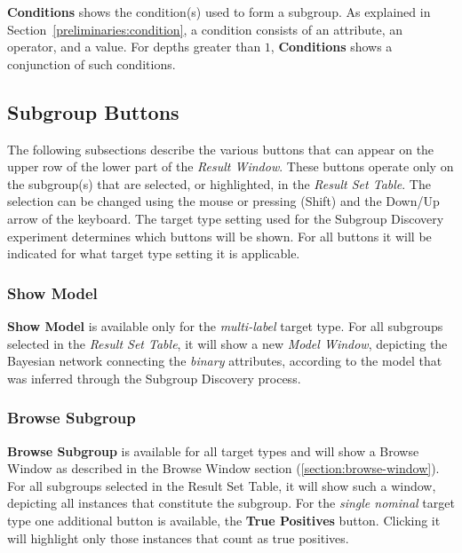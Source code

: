 \documentclass{article}
\begin{document}
\textbf{Conditions} shows the condition(s) used to form a subgroup.
As explained in Section~\ref{preliminaries:condition}, a condition consists of an attribute, an operator, and a value.
For depths greater than $1$, \textbf{Conditions} shows a conjunction of such conditions.



\subsection{Subgroup Buttons}
\label{result-window:subgroup-buttons}
The following subsections describe the various buttons that can appear on the upper row of the lower part of the \emph{Result Window}.
These buttons operate only on the subgroup(s) that are selected, or highlighted, in the \emph{Result Set Table}.
The selection can be changed using the mouse or pressing (Shift) and the Down/Up arrow of the keyboard.
The target type setting used for the Subgroup Discovery experiment determines which buttons will be shown.
For all buttons it will be indicated for what target type setting it is applicable.



\subsubsection{Show Model}
\label{result-window:model}
\textbf{Show Model} is available only for the \emph{multi-label} target type.
For all subgroups selected in the \emph{Result Set Table}, it will show a new \emph{Model Window}, depicting the Bayesian network connecting the \emph{binary} attributes, according to the model that was inferred through the Subgroup Discovery process.



\subsubsection{Browse Subgroup}
\label{result-window:browse}
\textbf{Browse Subgroup} is available for all target types and will show a Browse Window as described in the Browse Window section (\ref{section:browse-window}).
For all subgroups selected in the Result Set Table, it will show such a window, depicting all instances that constitute the subgroup.
For the \emph{single nominal} target type one additional button is available, the \textbf{True Positives} button.
Clicking it will highlight only those instances that count as true positives.
\end{document}
